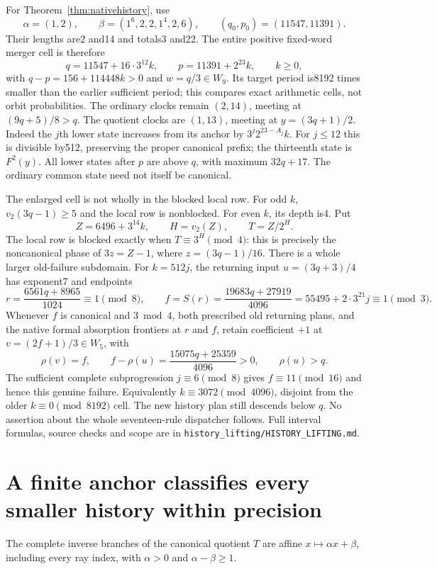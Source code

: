 \documentclass[11pt]{article}
\begin{document}
For Theorem~\ref{thm:nativehistory}, use
\[
 \alpha=(1,2),\qquad \beta=(1^6,2,2,1^4,2,6),
 \qquad (q_0,p_0)=(11547,11391).
\]
Their lengths are2 and14 and totals3 and22. The entire positive
fixed-word merger cell is therefore
\[
 q=11547+16\cdot3^{12}k,\qquad
 p=11391+2^{23}k,\qquad k\ge0,
 \tag{HL5}
\]
with $q-p=156+114448k>0$ and $w=q/3\in W_9$.
Its target period is8192 times smaller than the earlier sufficient
period; this compares exact arithmetic cells, not orbit probabilities.
The ordinary clocks remain $(2,14)$, meeting at $(9q+5)/8>q$.
The quotient clocks are $(1,13)$, meeting at $y=(3q+1)/2$.
Indeed the $j$th lower state increases from its anchor by
$3^j2^{23-A_j}k$. For $j\le12$ this is divisible by512, preserving
the proper canonical prefix; the thirteenth state is $F^2(y)$.
All lower states after $p$ are above $q$, with maximum $32q+17$.
The ordinary common state need not itself be canonical.

The enlarged cell is not wholly in the blocked local row.
For odd $k$, $v_2(3q-1)\ge5$ and the local row is nonblocked.
For even $k$, its depth is4. Put
\[
 Z=6496+3^{14}k,\qquad H=v_2(Z),\qquad T=Z/2^H.
\]
The local row is blocked exactly when $T\equiv3^H\pmod4$:
this is precisely the noncanonical phase of
$3z=Z-1$, where $z=(3q-1)/16$.
There is a whole larger old-failure subdomain. For $k=512j$,
the returning input $u=(3q+3)/4$ has exponent7 and endpoints
\[
 r=\frac{6561q+8965}{1024}\equiv1\pmod8,\qquad
 f=S(r)=\frac{19683q+27919}{4096}
       =55495+2\cdot3^{21}j\equiv1\pmod3.
 \tag{HL6}
\]
Whenever $f$ is canonical and $3\bmod4$, both prescribed old returning
plans, and the native formal absorption frontiers at $r$ and $f$, retain
coefficient $+1$ at $v=(2f+1)/3\in W_5$, with
\[
 \rho(v)=f,\qquad
 f-\rho(u)=\frac{15075q+25359}{4096}>0,\qquad \rho(u)>q.
\]
The sufficient complete subprogression $j\equiv6\pmod8$ gives
$f\equiv11\pmod{16}$ and hence this genuine failure.
Equivalently $k\equiv3072\pmod{4096}$, disjoint from the older
$k\equiv0\pmod{8192}$ cell. The new history plan still descends below
$q$. No assertion about the whole seventeen-rule dispatcher follows.
Full interval formulas, source checks and scope are in
\texttt{history\_lifting/HISTORY\_LIFTING.md}.

\section{A finite anchor classifies every smaller history within precision}
The complete inverse branches of the canonical quotient $T$ are affine
$x\mapsto\alpha x+\beta$, including every ray index, with
$\alpha>0$ and $\alpha-\beta\ge1$.
\end{document}
